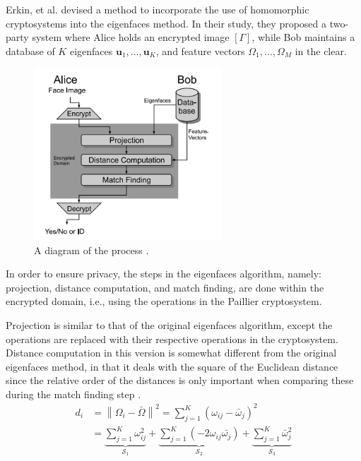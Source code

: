 
Erkin, et al. \cite{hutchison_privacy-preserving_2009-2} devised a method to incorporate the use of homomorphic cryptosystems into the eigenfaces method. In their study, they proposed a two-party system where Alice holds an encrypted image $\left[\Gamma\right]$, while Bob maintains a database of $K$ eigenfaces $\mathbf{u}_1, \ldots, \mathbf{u}_K$, and feature vectors $\Omega_1, \ldots, \Omega_M$ in the clear.

\begin{figure}[!h]
    \centering
    \includegraphics[width=7cm]{figures/secure_eigenfaces.png}
    \caption{A diagram of the process \cite{hutchison_privacy-preserving_2009-2}.}
\end{figure}


In order to ensure privacy, the steps in the eigenfaces algorithm, namely: projection, distance computation, and match finding, are done within the encrypted domain, i.e., using the operations in the Paillier cryptosystem.

Projection is similar to that of the original eigenfaces algorithm, except the operations are replaced with their respective operations in the cryptosystem. Distance computation in this version is somewhat different from the original eigenfaces method, in that it deals with the square of the Euclidean distance since the relative order of the distances is only important when comparing these during the match finding step \cite{hutchison_privacy-preserving_2009-2}.
\begin{align*}
    d_i &= \left\lVert \Omega_i - \bar{\Omega} \right\rVert ^2 = \sum_{j=1}^{K} \left(\omega_{ij} - \bar{\omega}_j\right)^2 \\
        &= \underbrace{\sum_{j=1}^{K} \omega_{ij}^2}_{\mathcal{S}_1} + \underbrace{\sum_{j=1}^{K} \left(-2 \omega_{ij} \bar{\omega_j}\right)}_{\mathcal{S}_2} + \underbrace{\sum_{j=1}^{K} \bar{\omega}_{j}^2}_{\mathcal{S}_3}
\end{align*}

